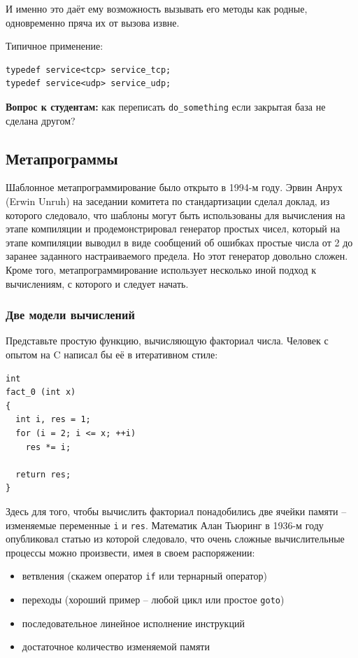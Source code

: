 \documentclass[a4paper,12pt,oneside]{article}
\newif\ifanswers
\begin{document}
И именно это даёт ему возможность вызывать его методы как родные, одновременно пряча их от вызова извне.

Типичное применение:

\begin{lstlisting}
typedef service<tcp> service_tcp;
typedef service<udp> service_udp;
\end{lstlisting}

\textbf{Вопрос к студентам:} как переписать \lstinline!do_something! если закрытая база не сделана другом?

\ifanswers
Как вариант: \lstinline!transport_type::send(....);!
\fi

\pagebreak
\subsection{Метапрограммы}

Шаблонное метапрограммирование было открыто в 1994-м году. Эрвин Анрух (Erwin Unruh) на заседании комитета по стандартизации сделал доклад, из которого следовало, что шаблоны могут быть использованы для вычисления на этапе компиляции и продемонстрировал генератор простых чисел, который на этапе компиляции выводил в виде сообщений об ошибках простые числа от 2 до заранее заданного настраиваемого предела. Но этот генератор довольно сложен. Кроме того, метапрограммирование использует несколько иной подход к вычислениям, с которого и следует начать.

\subsubsection{Две модели вычислений}\label{ComputationModels}

Представьте простую функцию, вычисляющую факториал числа. Человек с опытом на C написал бы её в итеративном стиле:

\begin{lstlisting}
int
fact_0 (int x)
{
  int i, res = 1;
  for (i = 2; i <= x; ++i)
    res *= i;

  return res;
}
\end{lstlisting}

Здесь для того, чтобы вычислить факториал понадобились две ячейки памяти -- изменяемые переменные \lstinline!i! и \lstinline!res!. Математик Алан Тьюринг в 1936-м году опубликовал статью из которой следовало, что очень сложные вычислительные процессы можно произвести, имея в своем распоряжении:

\begin{itemize}
\item ветвления (скажем оператор \lstinline!if! или тернарный оператор)
\item переходы (хороший пример -- любой цикл или простое \lstinline!goto!)
\item последовательное линейное исполнение инструкций
\item достаточное количество изменяемой памяти
\end{itemize}
\end{document}
